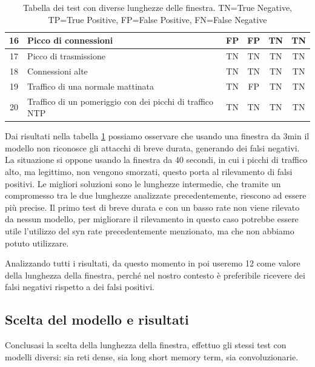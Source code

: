 \begin{table}
\begin{tabularx}{\textwidth}{||c X c c c c||}
        \hline 
        16 & Picco di connessioni & \cellcolor{orange} FP & \cellcolor{orange} FP & TN & TN\\        
        \hline
        17 & Picco di trasmissione & TN & TN & TN & TN\\        
        \hline
        18 & Connessioni alte & TN & TN & TN & TN\\
        \hline
        19 & Traffico di una normale mattinata & TN & \cellcolor{orange} FP & TN & TN\\ 
        \hline
        20 & Traffico di un pomeriggio con dei picchi di traffico NTP & TN & TN & TN & TN\\ 
        \hline
    \end{tabularx}
    \caption{Tabella dei test con diverse lunghezze delle finestra. TN=True Negative, TP=True Positive,  FP=False Positive,  FN=False Negative}
    \label{table:finestra}
\end{table}
\FloatBarrier

Dai risultati nella tabella \ref{table:finestra} possiamo osservare che usando una finestra da 3min il modello non riconosce gli attacchi di breve durata, generando dei falsi negativi. La situazione si oppone usando la finestra da 40 secondi, in cui i picchi di traffico alto, ma legittimo, non vengono smorzati, questo porta al rilevamento di falsi positivi. Le migliori soluzioni sono le lunghezze intermedie, che tramite un compromesso tra le due lunghezze analizzate precedentemente, riescono ad essere più precise.
Il primo test di breve durata e con un basso rate non viene rilevato da nessun modello, per migliorare il rilevamento in questo caso potrebbe essere utile l'utilizzo del syn rate precedentemente menzionato, ma che non abbiamo potuto utilizzare.

Analizzando tutti i risultati, da questo momento in poi useremo 12 come valore della lunghezza della finestra, perché nel nostro contesto è preferibile ricevere dei falsi negativi rispetto a dei falsi positivi.


\subsection{Scelta del modello e risultati}

Conclusasi la scelta della lunghezza della finestra, effettuo gli stessi test con modelli diversi: sia reti dense, sia long short memory term, sia convoluzionarie.

